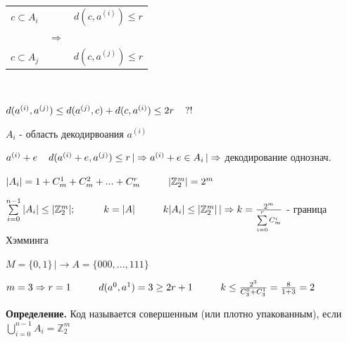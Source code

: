 \documentclass[12pt]{article}
\begin{document}
\begin{tabular}{c|cc}
    $c \subset A_i$ &               & $d(c,a^{(i)}) \leq r$ \\
                    & $\Rightarrow$                         \\
    $c \subset A_j$ &               & $d(c,a^{(j)}) \leq r$ \\
\end{tabular}\par
$ $\par
$d(a^{(i)},a^{(j)}) \leq d(a^{(j)},c) + d(c,a^{(i)}) \leq 2r \hspace{4 mm} ?!$\par
$A_i$ - область декодирвоания $a^{(i)}$\par
$a^{(i)}+e \hspace{4 mm} d(a^{(i)}+e, a^{(j)}) \leq r \, | \Rightarrow a^{(i)}+e \in A_i \, | \Rightarrow$ декодирование однознач.\par
$|A_i| = 1 + C_m^1 + C_m^2 + ... + C_m^r \hspace{1 cm} |\mathbb{Z}_2^m| = 2^m$\par
$\sum\limits_{i=0}^{n-1}|A_i| \leq |\mathbb{Z}_2^m|; \hspace{1 cm} k = |A| \hspace{1 cm} k|A_i| \leq |\mathbb{Z}_2^m| \, |\Rightarrow k = \frac{2^m}{\sum\limits_{i=0}^{r} C_m^i}$ - граница Хэмминга\par
$M = \{ 0, 1 \} \, |\to A = \{ 000,...,111 \}$\par
$m = 3 \Rightarrow r = 1 \hspace{1 cm} d(a^0, a^1)=3 \geq 2r+1 \hspace{1 cm} k \leq \frac{2^3}{C_3^0 + C_3^1} = \frac{8}{1+3} = 2$\par
\textbf{Определение.} Код называется совершенным (или плотно упакованным), если $\bigcup\limits_{i=0}^{n-1}A_i = \mathbb{Z}_2^m$\par
\end{document}
